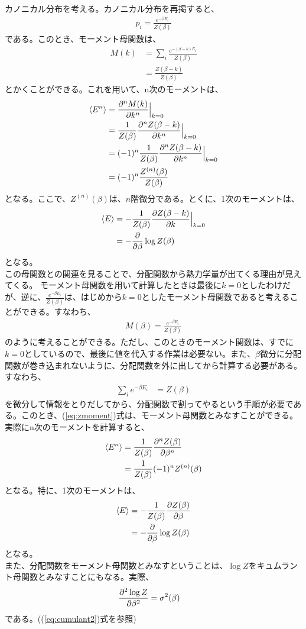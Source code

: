 \documentclass[a4paper,11pt]{jsarticle}
\numberwithin{equation}{section}
\begin{document}
カノニカル分布を考える。カノニカル分布を再掲すると、
\begin{align}
  p_i = \frac{e^{-\beta E_i}}{Z(\beta)}
\end{align}
である。このとき、モーメント母関数は、
\begin{align}
  M(k) &= \sum_{i}\frac{e^{-(\beta - k)E_i}}{Z(\beta)}\\
  &= \frac{Z(\beta - k)}{Z(\beta)}
\end{align}
とかくことができる。これを用いて、n次のモーメントは、
\begin{align}
  \expval{E^n} &= \pdv[n]{M(k)}{k}\Big|_{k=0}\\
  &= \frac{1}{Z(\beta)}\pdv[n]{Z(\beta - k)}{k}\Big|_{k=0}\\
  &= (-1)^n\frac{1}{Z(\beta)}\pdv[n]{Z(\beta-k)}{k}\Big|_{k=0}\\
  &= (-1)^n\frac{Z^{(n)}(\beta)}{Z(\beta)}
\end{align}
となる。ここで、$Z^{(n)}(\beta)$は、$n$階微分である。とくに、1次のモーメントは、
\begin{align}
  \expval{E} &= -\frac{1}{Z(\beta)}\pdv{Z(\beta - k)}{k}\Big|_{k=0}\\
  &= -\pdv{\beta}\log Z(\beta)
\end{align}
となる。\\
この母関数との関連を見ることで、分配関数から熱力学量が出てくる理由が見えてくる。
モーメント母関数を用いて計算したときは最後に$k=0$としたわけだが、逆に、$\frac{e^{-\beta E_i}}{Z(\beta)}$は、はじめから$k=0$としたモーメント母関数であると考えることができる。すなわち、
\begin{align}
  M(\beta) = \frac{e^{-\beta E_i}}{Z(\beta)}
\end{align}
のように考えることができる。ただし、このときのモーメント関数は、すでに$k=0$としているので、最後に値を代入する作業は必要ない。また、$\beta$微分に分配関数が巻き込まれないように、分配関数を外に出してから計算する必要がある。すなわち、
\begin{align}
  \sum_{i} e^{-\beta E_i} &= Z(\beta) \label{eq:zmoment}
\end{align}
を微分して情報をとりだしてから、分配関数で割ってやるという手順が必要である。このとき、(\ref{eq:zmoment})式は、モーメント母関数とみなすことができる。\\
実際にn次のモーメントを計算すると、
\begin{align}
  \expval{E^n} &= \frac{1}{Z(\beta)}\pdv[n]{Z(\beta)}{\beta}\\
  &= \frac{1}{Z(\beta)}(-1)^nZ^{(n)}(\beta)
\end{align}
となる。特に、1次のモーメントは、
\begin{align}
  \expval{E} &= -\frac{1}{Z(\beta)}\pdv{Z(\beta)}{\beta}\\
  &= -\pdv{\beta}\log Z(\beta)
\end{align}
となる。\\
また、分配関数をモーメント母関数とみなすということは、$\log Z$をキュムラント母関数とみなすことにもなる。実際、
\begin{align}
  \pdv[2]{\log Z}{\beta} &= \sigma^2(\beta)
\end{align}
である。((\ref{eq:cumulant2})式を参照)\\
\end{document}
